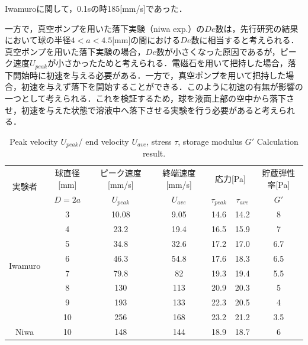 Iwamuro\cite{ref:9}に関して，0.1sの時185[mm/s]であった．


一方で，真空ポンプを用いた落下実験（niwa exp.）の$De$数は，先行研究の結果において球の半径$4<a<4.5$[mm]の間における$De$数に相当すると考えられる．真空ポンプを用いた落下実験の場合，$De$数が小さくなった原因であるが，ピーク速度$U_{peak}$が小さかったためと考えられる．電磁石を用いて把持した場合，落下開始時に初速を与える必要がある．一方で，真空ポンプを用いて把持した場合，初速を与えず落下を開始することができる．このように初速の有無が影響の一つとして考えられる．これを検証するため，球を液面上部の空中から落下させ，初速を与えた状態で溶液中へ落下させる実験を行う必要があると考えられる．

\begin{table}[hbtp]
    \caption{Peak velocity $U_{peak}$/ end velocity $U_{ave}$, stress $\tau$, storage modulus $G'$ Calculation result.}
    \label{table:iwamuro}
    \centering
    \begin{tabular}{ccccccc}
      \hline
      \multirow{2}{*}{実験者} & 球直径[mm] & ピーク速度[mm/s] & 終端速度[mm/s] &\multicolumn{2}{c}{応力[Pa]} & 貯蔵弾性率[Pa] \\
       & $D=2a$ & $U_{peak}$ & $U_{ave}$ &  $\tau_{peak}$ & $\tau_{ave}$ & $G'$\\
      \hline \hline
      \multirow{8}{*}{Iwamuro} & 3  & 10.08 & 9.05 & 14.6 & 14.2 & 8\\
      & 4  & 23.2 & 19.4 & 16.5 & 15.9 & 7\\
      & 5  & 34.8 & 32.6 & 17.2 & 17.0 & 6.7 \\
      & 6  & 46.3 & 54.8 & 17.6 & 18.3 & 6.5\\
      & 7  & 79.8 & 82 & 19.3 & 19.4 & 5.5\\
      & 8  & 130 & 113 & 20.9 & 20.3 & 5 \\
      & 9  & 193 & 133 & 22.3 & 20.5 & 4\\
      & 10 & 256 & 168 & 23.2 & 21.2 & 3.5\\
      \hline \hline
      Niwa & 10 & 148 & 144 & 18.9 & 18.7 & 6 \\
      \hline
    \end{tabular}
\end{table}
